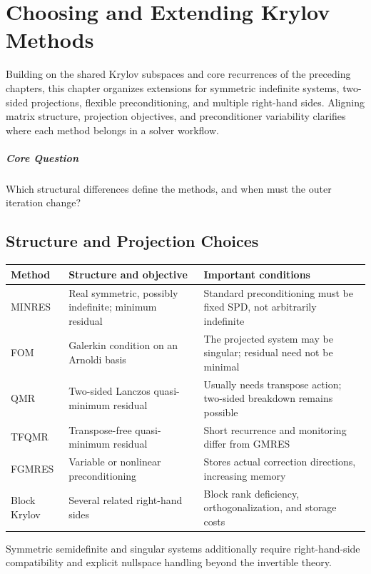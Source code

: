 \chapter{Choosing and Extending Krylov Methods}\label{v0ch:15}
\begin{chaptersummary}
Building on the shared Krylov subspaces and core recurrences of the preceding chapters, this chapter organizes extensions for symmetric indefinite systems, two-sided projections, flexible preconditioning, and multiple right-hand sides. Aligning matrix structure, projection objectives, and preconditioner variability clarifies where each method belongs in a solver workflow.
\end{chaptersummary}
\paragraph{Core Question}Which structural differences define the methods, and when must the outer iteration change?

\section{Structure and Projection Choices}
\begin{center}\small
\begin{tabularx}{\textwidth}{lXX}
\toprule Method&Structure and objective&Important conditions\\\midrule
MINRES&Real symmetric, possibly indefinite; minimum residual&Standard preconditioning must be fixed SPD, not arbitrarily indefinite\\
FOM&Galerkin condition on an Arnoldi basis&The projected system may be singular; residual need not be minimal\\
QMR&Two-sided Lanczos quasi-minimum residual&Usually needs transpose action; two-sided breakdown remains possible\\
TFQMR&Transpose-free quasi-minimum residual&Short recurrence and monitoring differ from GMRES\\
FGMRES&Variable or nonlinear preconditioning&Stores actual correction directions, increasing memory\\
Block Krylov&Several related right-hand sides&Block rank deficiency, orthogonalization, and storage costs\\\bottomrule
\end{tabularx}
\end{center}
Symmetric semidefinite and singular systems additionally require right-hand-side compatibility and explicit nullspace handling beyond the invertible theory.
